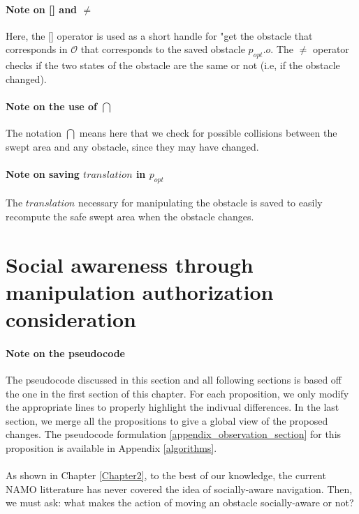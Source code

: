 \paragraph{Note on [] and $\neq$}\label{operators_note} Here, the [] operator is used as a short handle for "get the obstacle that corresponds in $\mathcal{O}$ that corresponds to the saved obstacle $p_{opt}.o$. The $\neq$ operator checks if the two states of the obstacle are the same or not (i.e, if the obstacle changed).

\paragraph{Note on the use of $\bigcap$}\label{area_intersect_note} The notation $\bigcap$ means here that we check for possible collisions between the swept area and any obstacle, since they may have changed.

\paragraph{Note on saving $translation$ in $p_{opt}$}\label{translation_note} The $translation$ necessary for manipulating the obstacle is saved to easily recompute the safe swept area when the obstacle changes.

\section{Social awareness through manipulation authorization consideration}\label{social_authorization_section}

\paragraph{Note on the pseudocode} The pseudocode discussed in this section and all following sections is based off the one in the first section of this chapter. For each proposition, we only modify the appropriate lines to properly highlight the indivual differences. In the last section, we merge all the propositions to give a global view of the proposed changes. The pseudocode formulation \ref{appendix_observation_section} for this proposition is available in Appendix \ref{algorithms}.

\paragraph{} As shown in Chapter \ref{Chapter2}, to the best of our knowledge, the current NAMO litterature has never covered the idea of socially-aware navigation. Then, we must ask: what makes the action of moving an obstacle socially-aware or not?

